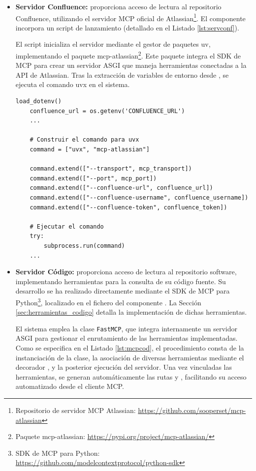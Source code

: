 \begin{itemize}
  \item \textbf{Servidor Confluence:} proporciona acceso de lectura al repositorio Confluence, utilizando el servidor MCP oficial de Atlassian\footnote{Repositorio de servidor MCP Atlassian: \url{https://github.com/sooperset/mcp-atlassian}}. El componente  incorpora un script de lanzamiento  (detallado en el Listado \ref{lst:servconf}).

    El script inicializa el servidor mediante el gestor de paquetes uv, implementando el paquete mcp-atlassian\footnote{Paquete mcp-atlassian: \url{https://pypi.org/project/mcp-atlassian/}}. Este paquete integra el SDK de MCP para crear un servidor ASGI que maneja herramientas conectadas a la API de Atlassian. Tras la extracción de variables de entorno desde , se ejecuta el comando uvx en el sistema.
    \begin{lstlisting}[caption={\protect\opus{launch_mcp_server_confluence.py}: ejecución de lanzamiento del servidor MCP Confluence},label={lst:servconf}]
    load_dotenv() 
    confluence_url = os.getenv('CONFLUENCE_URL')
    ...

    # Construir el comando para uvx
    command = ["uvx", "mcp-atlassian"]
    
    command.extend(["--transport", mcp_transport])
    command.extend(["--port", mcp_port]) 
    command.extend(["--confluence-url", confluence_url])
    command.extend(["--confluence-username", confluence_username])
    command.extend(["--confluence-token", confluence_token])

    # Ejecutar el comando
    try:
        subprocess.run(command)
    ...
\end{lstlisting}

\item\textbf{Servidor Código: }proporciona acceso de lectura al repositorio software, implementando herramientas para la consulta de su código fuente. Su desarrollo se ha realizado directamente mediante el SDK de MCP para Python\footnote{SDK de MCP para Python: \url{https://github.com/modelcontextprotocol/python-sdk}}, localizado en el fichero  del componente . La Sección \ref{sec:herramientas_codigo} detalla la implementación de dichas herramientas.

  El sistema emplea la clase \texttt{FastMCP}, que integra internamente un servidor ASGI para gestionar el enrutamiento de las herramientas implementadas. Como se especifica en el Listado \ref{lst:mcpcod}, el procedimiento consta de la instanciación de la clase, la asociación de diversas herramientas mediante el decorador , y la posterior ejecución del servidor. Una vez vinculadas las herramientas, se generan automáticamente las rutas  y , facilitando su acceso automatizado desde el cliente MCP.


\end{itemize}
